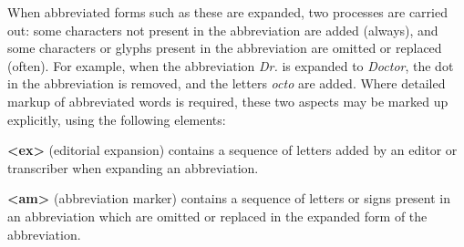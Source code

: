 When abbreviated forms such as these are expanded, two processes are carried out: some characters not present in the abbreviation are added (always), and some characters or glyphs present in the abbreviation are omitted or replaced (often). For example, when the abbreviation \textit{Dr.} is expanded to \textit{Doctor}, the dot in the abbreviation is removed, and the letters \textit{octo} are added. Where detailed markup of abbreviated words is required, these two aspects may be marked up explicitly, using the following elements: 
\begin{sansreflist}
  
\item [\textbf{<ex>}] (editorial expansion) contains a sequence of letters added by an editor or transcriber when expanding an abbreviation.
\item [\textbf{<am>}] (abbreviation marker) contains a sequence of letters or signs present in an abbreviation which are omitted or replaced in the expanded form of the abbreviation.
\end{sansreflist}
